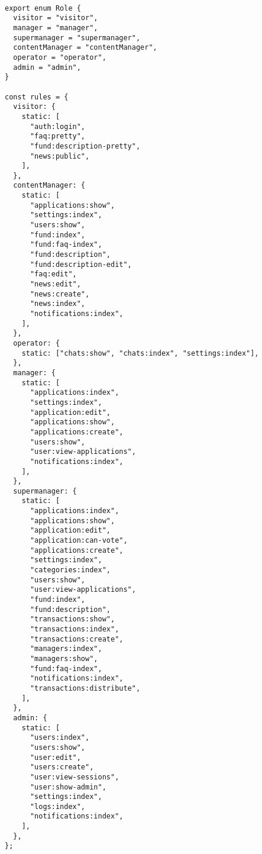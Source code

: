 \begin{lstlisting}[frame=single, basicstyle=\footnotesize\ttfamily, label={lst:POST}, caption={Словарь маппинга ролей на функциональность},captionpos=b]

export enum Role {
  visitor = "visitor",
  manager = "manager",
  supermanager = "supermanager",
  contentManager = "contentManager",
  operator = "operator",
  admin = "admin",
}

const rules = {
  visitor: {
    static: [
      "auth:login",
      "faq:pretty",
      "fund:description-pretty",
      "news:public",
    ],
  },
  contentManager: {
    static: [
      "applications:show",
      "settings:index",
      "users:show",
      "fund:index",
      "fund:faq-index",
      "fund:description",
      "fund:description-edit",
      "faq:edit",
      "news:edit",
      "news:create",
      "news:index",
      "notifications:index",
    ],
  },
  operator: {
    static: ["chats:show", "chats:index", "settings:index"],
  },
  manager: {
    static: [
      "applications:index",
      "settings:index",
      "application:edit",
      "applications:show",
      "applications:create",
      "users:show",
      "user:view-applications",
      "notifications:index",
    ],
  },
  supermanager: {
    static: [
      "applications:index",
      "applications:show",
      "application:edit",
      "application:can-vote",
      "applications:create",
      "settings:index",
      "categories:index",
      "users:show",
      "user:view-applications",
      "fund:index",
      "fund:description",
      "transactions:show",
      "transactions:index",
      "transactions:create",
      "managers:index",
      "managers:show",
      "fund:faq-index",
      "notifications:index",
      "transactions:distribute",
    ],
  },
  admin: {
    static: [
      "users:index",
      "users:show",
      "user:edit",
      "users:create",
      "user:view-sessions",
      "user:show-admin",
      "settings:index",
      "logs:index",
      "notifications:index",
    ],
  },
};

\end{lstlisting}